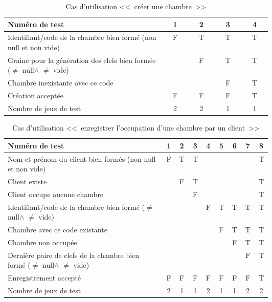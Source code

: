 \documentclass[11pt,article]{article}
\newcommand{\nullvalue}{\textsf{null}\xspace}
\begin{document}
\begin{table}[htbp!]
\begin{tabular}{|p{0.6\linewidth}|c|c|c|c|}
\hline
Numéro de test
&1&2&3&4\\
\hline
\hline
Identifiant/code de la chambre bien formé (non \nullvalue et non vide)
&F&T&T&T\\
\hline
Graine pour la génération des clefs bien formée ($\neq$ \nullvalue $\land$ $\neq$ vide)
& &F&T&T\\
\hline
Chambre inexistante avec ce code
& & &F&T\\
\hline
\hline
Création acceptée
&F&F&F&T\\
\hline
\hline
Nombre de jeux de test
&2&2&1&1\\
\hline
\end{tabular}
\caption{Cas d'utilisation <<~créer une chambre~>>}
\end{table}
        \begin{table}[htbp!]
            \begin{tabular}{|p{0.6\linewidth}|c|c|c|c|c|c|c|c|}
                \hline
                Numéro de test
                    &1&2&3&4&5&6&7&8\\
                \hline
                \hline
                Nom et prénom du client bien formés (non \nullvalue et non vide)
                    &F&T&T& & & & &T\\
                \hline
                Client existe
                    & &F&T& & & & &T\\
                \hline
                Client occupe aucune chambre
                    & & &F& & & & &T\\
                \hline
                \hline
                Identifiant/code de la chambre bien formé ($\neq$ \nullvalue $\land$ $\neq$ vide)
                    & & & &F&T&T&T&T\\
                \hline
                Chambre avec ce code existante
                    & & & & &F&T&T&T\\
                \hline
                Chambre non occupée
                    & & & & & &F&T&T\\
                \hline
                Dernière paire de clefs de la chambre bien formé ($\neq$ \nullvalue $\land$ $\neq$ vide)
                    & & & & & & &F&T\\
                \hline
                \hline
                Enregistrement accepté
                    &F&F&F&F&F&F&F&T\\
                \hline
                \hline
                Nombre de jeux de test
                                    &2&1&1&2&1&1&2&2 \\
                \hline
            \end{tabular}
            \caption{Cas d'utilisation <<~enregistrer l'occupation d'une chambre par un client~>>}
        \end{table}
\end{document}
